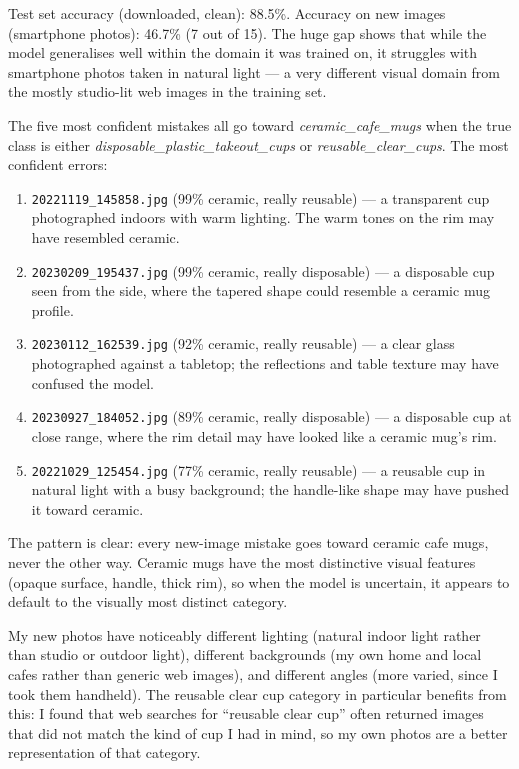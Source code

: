 \documentclass[11pt]{article}
\begin{document}

Test set accuracy (downloaded, clean): 88.5\%. Accuracy on new images (smartphone photos): 46.7\% (7 out of 15). The huge gap shows that while the model generalises well within the domain it was trained on, it struggles with smartphone photos taken in natural light --- a very different visual domain from the mostly studio-lit web images in the training set.

The five most confident mistakes all go toward \emph{ceramic\_cafe\_mugs} when the true class is either \emph{disposable\_plastic\_takeout\_cups} or \emph{reusable\_clear\_cups}. The most confident errors:

\begin{enumerate}
  \item \texttt{20221119\_145858.jpg} (99\% ceramic, really reusable) --- a transparent cup photographed indoors with warm lighting. The warm tones on the rim may have resembled ceramic.
  \item \texttt{20230209\_195437.jpg} (99\% ceramic, really disposable) --- a disposable cup seen from the side, where the tapered shape could resemble a ceramic mug profile.
  \item \texttt{20230112\_162539.jpg} (92\% ceramic, really reusable) --- a clear glass photographed against a tabletop; the reflections and table texture may have confused the model.
  \item \texttt{20230927\_184052.jpg} (89\% ceramic, really disposable) --- a disposable cup at close range, where the rim detail may have looked like a ceramic mug's rim.
  \item \texttt{20221029\_125454.jpg} (77\% ceramic, really reusable) --- a reusable cup in natural light with a busy background; the handle-like shape may have pushed it toward ceramic.
\end{enumerate}

The pattern is clear: every new-image mistake goes toward ceramic cafe mugs, never the other way. Ceramic mugs have the most distinctive visual features (opaque surface, handle, thick rim), so when the model is uncertain, it appears to default to the visually most distinct category.

My new photos have noticeably different lighting (natural indoor light rather than studio or outdoor light), different backgrounds (my own home and local cafes rather than generic web images), and different angles (more varied, since I took them handheld). The reusable clear cup category in particular benefits from this: I found that web searches for ``reusable clear cup'' often returned images that did not match the kind of cup I had in mind, so my own photos are a better representation of that category.
\end{document}
